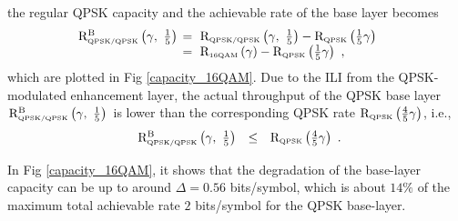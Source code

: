 \documentclass[10pt,fleqn, twocolumn]{IEEEtran}
\begin{document}
the regular QPSK capacity and the achievable rate of the base
layer becomes
\begin{equation}\hspace{-0.2in}
\begin{array}{rl}
{\rm R}_{\mbox{\tiny QPSK/QPSK}}^{\rm B}\left(\gamma,\
\frac{1}{5}\right)&\hspace{-0.08in}=\ {\rm R}_{\mbox{\tiny
QPSK/QPSK}}\left(\gamma,\
\frac{1}{5}\right)-{\rm R}_{\mbox{\tiny QPSK}} \left(\frac{1}{5}\gamma\right)\\
&\hspace{-0.08in}=\ {\rm R}_{\mbox{\tiny
16QAM}}\left(\gamma\right)-{\rm R}_{\mbox{\tiny
QPSK}}\left(\frac{1}{5}\gamma\right)\ ,
\end{array}\label{R_16QAM_B1}
\end{equation}
\noindent which are plotted in Fig \ref{capacity_16QAM}. Due to
the ILI from the QPSK-modulated enhancement layer, the actual
throughput of the QPSK base layer ${\rm R}_{\mbox{\tiny
QPSK/QPSK}}^{\rm B}\left(\gamma,\ \frac{1}{5} \right)$ is lower
than the corresponding QPSK rate ${\rm R}_{\mbox{\tiny
QPSK}}\left(\frac{4}{5}\gamma\right)$, i.e.,
\begin{equation}
\begin{array}{rcl}
{\rm R}_{\mbox{\tiny QPSK/QPSK}}^{\rm B}\left(\gamma,\ \frac{1}{5}
\right)&\leq&{\rm R}_{\mbox{\tiny QPSK}}
\left(\frac{4}{5}\gamma\right)
\end{array}.\label{R_16QAM_B2}
\end{equation}
\begin{figure}
\end{figure}
\noindent In Fig \ref{capacity_16QAM}, it shows that the
degradation of the base-layer capacity can be up to around
$\Delta=0.56$ bits/symbol, which is about $14\%$ of the maximum
total achievable rate $2$ bits/symbol for the QPSK base-layer.
\end{document}

